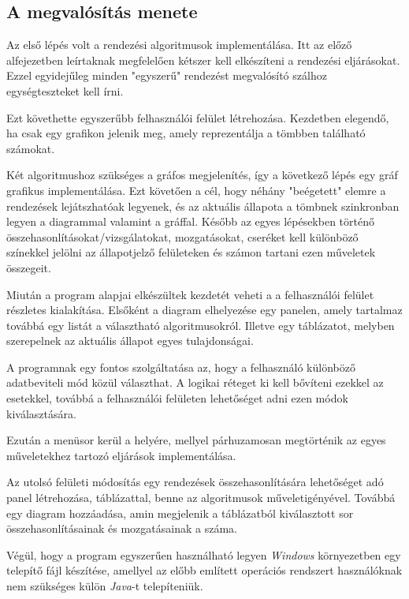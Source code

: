 \documentclass{elteikthesis}
\begin{document}
\subsection{A megvalósítás menete}
Az első lépés volt a rendezési algoritmusok implementálása. Itt az előző alfejezetben leírtaknak megfelelően kétszer kell elkészíteni a rendezési eljárásokat. Ezzel egyidejűleg minden "egyszerű" rendezést megvalósító szálhoz egységteszteket kell írni.\par
Ezt követhette egyszerűbb felhasználói felület létrehozása. Kezdetben elegendő, ha csak egy grafikon jelenik meg, amely reprezentálja a tömbben található számokat.\par
Két algoritmushoz szükséges a gráfos megjelenítés, így a következő lépés egy gráf grafikus implementálása.
Ezt követően a cél, hogy néhány "beégetett" elemre a rendezések lejátszhatóak legyenek, és az aktuális állapota a tömbnek szinkronban legyen a diagrammal valamint a gráffal. Később az egyes lépésekben történő összehasonlításokat/vizsgálatokat, mozgatásokat, cseréket kell különböző színekkel jelölni az állapotjelző felületeken és számon tartani ezen műveletek összegeit.\par
Miután a program alapjai elkészültek kezdetét veheti a a felhasználói felület részletes kialakítása. Elsőként a diagram elhelyezése egy panelen, amely tartalmaz továbbá egy listát a választható algoritmusokról. Illetve egy táblázatot, melyben szerepelnek az aktuális állapot egyes tulajdonságai.\par
A programnak egy fontos szolgáltatása az, hogy a felhasználó különböző adatbeviteli mód közül választhat. A logikai réteget ki kell bővíteni ezekkel az esetekkel, továbbá a felhasználói felületen lehetőséget adni ezen módok kiválasztására.\par
Ezután a menüsor kerül a helyére, mellyel párhuzamosan megtörténik az egyes műveletekhez tartozó eljárások implementálása.\par
Az utolsó felületi módosítás egy rendezések összehasonlítására lehetőséget adó panel létrehozása, táblázattal, benne az algoritmusok műveletigényével. Továbbá egy diagram hozzáadása, amin megjelenik a táblázatból kiválasztott sor összehasonlításainak és mozgatásainak a száma.\par
Végül, hogy a program egyszerűen használható legyen \emph{Windows} környezetben egy telepítő fájl készítése, amellyel az előbb említett operációs rendszert használóknak nem szükséges külön \emph{Java}-t telepíteniük.
\end{document}
